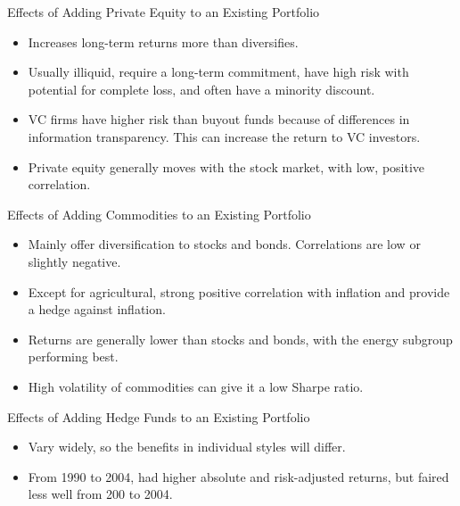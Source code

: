 \documentclass[../custom]{flashcards}
\begin{document}
\begin{flashcard}{Effects of Adding Private Equity to an Existing Portfolio}
    \begin{itemize}
        \item Increases long-term returns more than diversifies.
        \item Usually illiquid, require a long-term commitment, have high risk with potential for complete loss, and often have a minority discount.
        \item VC firms have higher risk than buyout funds because of differences in information transparency. This can increase the return to VC investors.
        \item Private equity generally moves with the stock market, with low, positive correlation.
    \end{itemize}
\end{flashcard}

\begin{flashcard}{Effects of Adding Commodities to an Existing Portfolio}
    \begin{itemize}
        \item Mainly offer diversification to stocks and bonds. Correlations are low or slightly negative.
        \item Except for agricultural, strong positive correlation with inflation and provide a hedge against inflation.
        \item Returns are generally lower than stocks and bonds, with the energy subgroup performing best.
        \item High volatility of commodities can give it a low Sharpe ratio.
    \end{itemize}
\end{flashcard}

\begin{flashcard}{Effects of Adding Hedge Funds to an Existing Portfolio}
    \begin{itemize}
        \item Vary widely, so the benefits in individual styles will differ.
        \item From 1990 to 2004, had higher absolute and risk-adjusted returns, but faired less well from 200 to 2004.
    \end{itemize}
\end{flashcard}
\end{document}
